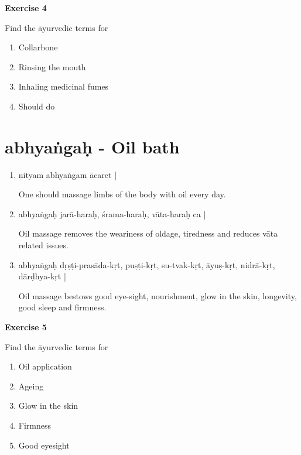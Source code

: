 \begin{center}
\textbf{\large Exercise 4}
\end{center}

Find the āyurvedic terms for
\begin{enumerate}
\renewcommand{\theenumi}{\alph{enumi}}
\renewcommand{\labelenumi}{\theenumi.}
\item Collarbone
\item Rinsing the mouth
\item Inhaling medicinal fumes
\item Should do
\end{enumerate}

\chapter{abhyaṅgaḥ - Oil bath}

\begin{enumerate}
\item {}

nityam abhyaṅgam ācaret |

One should massage limbs of the body with oil every day. 

\item {}

abhyaṅgaḥ jarā-haraḥ, śrama-haraḥ, vāta-haraḥ ca |

Oil massage removes the weariness of oldage, tiredness and reduces vāta related issues.

\item {}

abhyaṅgaḥ dṛṣṭi-prasāda-kṛt, puṣṭi-kṛt, su-tvak-kṛt, āyuṣ-kṛt, nidrā-kṛt, dārḍhya-kṛt | 

Oil massage bestows good eye-sight, nourishment, glow in the skin, longevity, good sleep and firmness.
\end{enumerate}

\begin{center}
\textbf{\large Exercise 5}
\end{center}

Find the āyurvedic terms for
\begin{enumerate}
\renewcommand{\theenumi}{\alph{enumi}}
\renewcommand{\labelenumi}{\theenumi.}
\item Oil application
\item Ageing
\item Glow in the skin
\item Firmness
\item Good eyesight
\end{enumerate}

